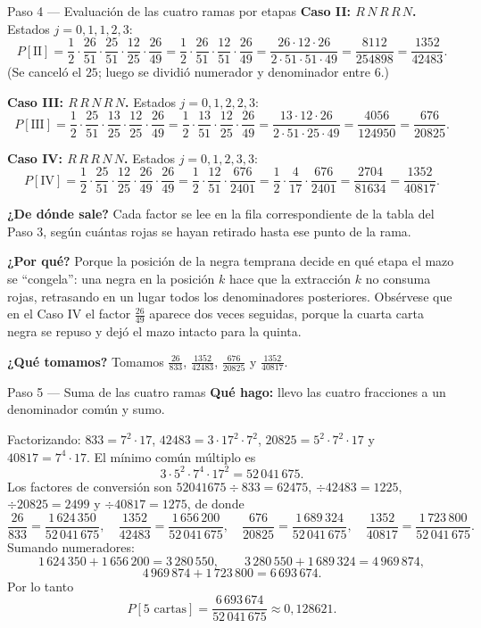 \documentclass[11pt]{article}
\begin{document}
\begin{sol}
\begin{paso}{Paso 4 --- Evaluaci\'on de las cuatro ramas por etapas}
\textbf{Caso II: $R\,N\,R\,R\,N$.} Estados $j=0,1,1,2,3$:
\[
P[\text{II}]=\frac{1}{2}\cdot\frac{26}{51}\cdot\frac{25}{51}\cdot\frac{12}{25}\cdot\frac{26}{49}
=\frac{1}{2}\cdot\frac{26}{51}\cdot\frac{12}{51}\cdot\frac{26}{49}
=\frac{26\cdot 12\cdot 26}{2\cdot 51\cdot 51\cdot 49}
=\frac{8112}{254898}=\frac{1352}{42483}.
\]
(Se cancel\'o el $25$; luego se dividi\'o numerador y denominador entre $6$.)

\textbf{Caso III: $R\,R\,N\,R\,N$.} Estados $j=0,1,2,2,3$:
\[
P[\text{III}]=\frac{1}{2}\cdot\frac{25}{51}\cdot\frac{13}{25}\cdot\frac{12}{25}\cdot\frac{26}{49}
=\frac{1}{2}\cdot\frac{13}{51}\cdot\frac{12}{25}\cdot\frac{26}{49}
=\frac{13\cdot 12\cdot 26}{2\cdot 51\cdot 25\cdot 49}
=\frac{4056}{124950}=\frac{676}{20825}.
\]

\textbf{Caso IV: $R\,R\,R\,N\,N$.} Estados $j=0,1,2,3,3$:
\[
P[\text{IV}]=\frac{1}{2}\cdot\frac{25}{51}\cdot\frac{12}{25}\cdot\frac{26}{49}\cdot\frac{26}{49}
=\frac{1}{2}\cdot\frac{12}{51}\cdot\frac{676}{2401}
=\frac{1}{2}\cdot\frac{4}{17}\cdot\frac{676}{2401}
=\frac{2704}{81634}=\frac{1352}{40817}.
\]

\textbf{¿De d\'onde sale?} Cada factor se lee en la fila correspondiente de la tabla del Paso 3, seg\'un cu\'antas rojas se hayan retirado hasta ese punto de la rama.

\textbf{¿Por qu\'e?} Porque la posici\'on de la negra temprana decide en qu\'e etapa el mazo se ``congela'': una negra en la posici\'on $k$ hace que la extracci\'on $k$ no consuma rojas, retrasando en un lugar todos los denominadores posteriores. Obs\'ervese que en el Caso IV el factor $\frac{26}{49}$ aparece dos veces seguidas, porque la cuarta carta negra se repuso y dej\'o el mazo intacto para la quinta.

\textbf{¿Qu\'e tomamos?} Tomamos $\frac{26}{833}$, $\frac{1352}{42483}$, $\frac{676}{20825}$ y $\frac{1352}{40817}$.
\end{paso}

\begin{paso}{Paso 5 --- Suma de las cuatro ramas}
\textbf{Qu\'e hago:} llevo las cuatro fracciones a un denominador com\'un y sumo.

Factorizando: $833=7^{2}\cdot 17$, $42483=3\cdot 17^{2}\cdot 7^{2}$, $20825=5^{2}\cdot 7^{2}\cdot 17$ y $40817=7^{4}\cdot 17$. El m\'inimo com\'un m\'ultiplo es
\[
3\cdot 5^{2}\cdot 7^{4}\cdot 17^{2}=52\,041\,675 .
\]
Los factores de conversi\'on son $52041675\div 833=62475$, $\div 42483=1225$, $\div 20825=2499$ y $\div 40817=1275$, de donde
\[
\frac{26}{833}=\frac{1\,624\,350}{52\,041\,675},
\quad
\frac{1352}{42483}=\frac{1\,656\,200}{52\,041\,675},
\quad
\frac{676}{20825}=\frac{1\,689\,324}{52\,041\,675},
\quad
\frac{1352}{40817}=\frac{1\,723\,800}{52\,041\,675}.
\]
Sumando numeradores:
\[
1\,624\,350+1\,656\,200=3\,280\,550,
\qquad
3\,280\,550+1\,689\,324=4\,969\,874,
\]
\[
4\,969\,874+1\,723\,800=6\,693\,674 .
\]
Por lo tanto
\[
P[\text{5 cartas}]=\frac{6\,693\,674}{52\,041\,675}\approx 0{,}128621 .
\]


\end{paso}
\end{sol}
\end{document}
